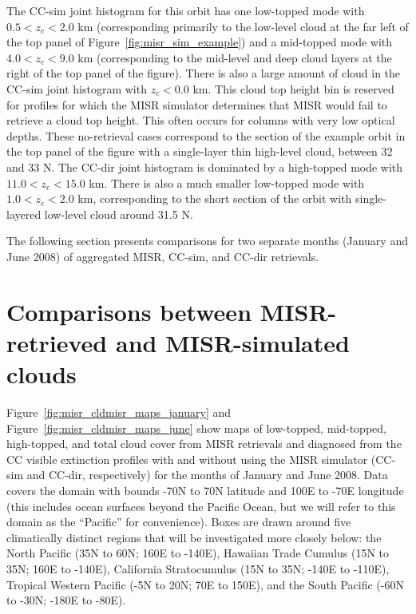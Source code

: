 The CC-sim joint histogram for this orbit has one low-topped mode with
\(0.5 < z_c < 2.0\) km (corresponding primarily to the low-level cloud
at the far left of the top panel of Figure~\ref{fig:misr_sim_example})
and a mid-topped mode with \(4.0 < z_c < 9.0\) km (corresponding to the
mid-level and deep cloud layers at the right of the top panel of the
figure). There is also a large amount of cloud in the CC-sim joint
histogram with \(z_c < 0.0\) km. This cloud top height bin is reserved
for profiles for which the MISR simulator determines that MISR would
fail to retrieve a cloud top height. This often occurs for columns with
very low optical depths. These no-retrieval cases correspond to the
section of the example orbit in the top panel of the figure with a
single-layer thin high-level cloud, between 32 and 33 N. The CC-dir
joint histogram is dominated by a high-topped mode with
\(11.0 < z_c < 15.0\) km. There is also a much smaller low-topped mode
with \(1.0 < z_c < 2.0\) km, corresponding to the short section of the
orbit with single-layered low-level cloud around 31.5 N.

The following section presents comparisons for two separate months
(January and June 2008) of aggregated MISR, CC-sim, and CC-dir
retrievals.

\section{Comparisons between MISR-retrieved and MISR-simulated
clouds}\label{sec:misrResults}

Figure~\ref{fig:misr_cldmisr_maps_january} and
Figure~\ref{fig:misr_cldmisr_maps_june} show maps of low-topped,
mid-topped, high-topped, and total cloud cover from MISR retrievals and
diagnosed from the CC visible extinction profiles with and without using
the MISR simulator (CC-sim and CC-dir, respectively) for the months of
January and June 2008. Data covers the domain with bounds -70N to 70N
latitude and 100E to -70E longitude (this includes ocean surfaces beyond
the Pacific Ocean, but we will refer to this domain as the ``Pacific''
for convenience). Boxes are drawn around five climatically distinct
regions that will be investigated more closely below: the North Pacific
(35N to 60N; 160E to -140E), Hawaiian Trade Cumulus (15N to 35N; 160E to
-140E), California Stratocumulus (15N to 35N; -140E to -110E), Tropical
Western Pacific (-5N to 20N; 70E to 150E), and the South Pacific (-60N
to -30N; -180E to -80E).


